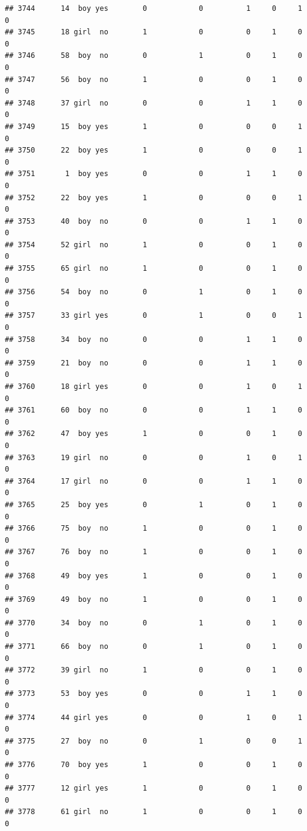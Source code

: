 \documentclass[man]{apa6}
\begin{document}
\begin{verbatim}
## 3744      14  boy yes        0            0          1     0     1     0
## 3745      18 girl  no        1            0          0     1     0     0
## 3746      58  boy  no        0            1          0     1     0     0
## 3747      56  boy  no        1            0          0     1     0     0
## 3748      37 girl  no        0            0          1     1     0     0
## 3749      15  boy yes        1            0          0     0     1     0
## 3750      22  boy yes        1            0          0     0     1     0
## 3751       1  boy yes        0            0          1     1     0     0
## 3752      22  boy yes        1            0          0     0     1     0
## 3753      40  boy  no        0            0          1     1     0     0
## 3754      52 girl  no        1            0          0     1     0     0
## 3755      65 girl  no        1            0          0     1     0     0
## 3756      54  boy  no        0            1          0     1     0     0
## 3757      33 girl yes        0            1          0     0     1     0
## 3758      34  boy  no        0            0          1     1     0     0
## 3759      21  boy  no        0            0          1     1     0     0
## 3760      18 girl yes        0            0          1     0     1     0
## 3761      60  boy  no        0            0          1     1     0     0
## 3762      47  boy yes        1            0          0     1     0     0
## 3763      19 girl  no        0            0          1     0     1     0
## 3764      17 girl  no        0            0          1     1     0     0
## 3765      25  boy yes        0            1          0     1     0     0
## 3766      75  boy  no        1            0          0     1     0     0
## 3767      76  boy  no        1            0          0     1     0     0
## 3768      49  boy yes        1            0          0     1     0     0
## 3769      49  boy  no        1            0          0     1     0     0
## 3770      34  boy  no        0            1          0     1     0     0
## 3771      66  boy  no        0            1          0     1     0     0
## 3772      39 girl  no        1            0          0     1     0     0
## 3773      53  boy yes        0            0          1     1     0     0
## 3774      44 girl yes        0            0          1     0     1     0
## 3775      27  boy  no        0            1          0     0     1     0
## 3776      70  boy yes        1            0          0     1     0     0
## 3777      12 girl yes        1            0          0     1     0     0
## 3778      61 girl  no        1            0          0     1     0     0

\end{verbatim}
\end{document}
